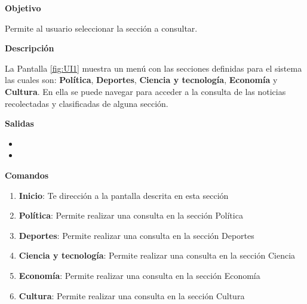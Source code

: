 \begin{large}
  \textbf{Objetivo}\\
\end{large}


Permite al usuario seleccionar la sección a consultar.\\

\begin{large}
  \textbf{Descripción}\\
\end{large}

La Pantalla \ref{fig:UI1} muestra un menú con las secciones definidas para el sistema las cuales son: \textbf{Política}, \textbf{Deportes}, \textbf{Ciencia y tecnología}, \textbf{Economía} y \textbf{Cultura}. En ella se puede navegar para acceder a la consulta de las noticias recolectadas y clasificadas de alguna sección.\\

\begin{large}
  \textbf{Salidas}
\end{large}

\begin{itemize}

  \item {}
  \item {}

\end{itemize}


\textbf{Comandos}

\begin{enumerate}

  \item \textbf{Inicio}: Te dirección a la pantalla descrita en esta sección
  \item \textbf{Política}: Permite realizar una consulta en la sección Política
  \item \textbf{Deportes}: Permite realizar una consulta en la sección Deportes
  \item \textbf{Ciencia y tecnología}: Permite realizar una consulta en la sección Ciencia
  \item \textbf{Economía}: Permite realizar una consulta en la sección Economía
  \item \textbf{Cultura}: Permite realizar una consulta en la sección Cultura

\end{enumerate}

